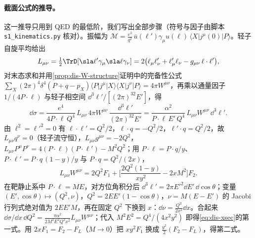 \paragraph{截面公式的推导。}这一推导只用到 QED 的最低阶，我们写出全部步骤（符号与因子由脚本 \texttt{s1\_kinematics.py} 核对）。振幅为 $\mathcal M=\frac{e^2}{q^2}\,\bar u(\ell')\gamma_\mu u(\ell)\,\langle X|j^\mu(0)|P\rangle$。轻子自旋平均给出
\[
L_{\mu\nu}=\tfrac12\TrD[\sla\ell'\gamma_\mu\sla\ell\gamma_\nu]=2\big(\ell_\mu\ell'_\nu+\ell'_\mu\ell_\nu-g_{\mu\nu}\,\ell\cdot\ell'\big),
\]
对末态求和并用\cref{prop:dis-W-structure}证明中的完备性公式 $\sum_X(2\pi)^4\delta^4(P+q-p_X)\langle P|j^\mu|X\rangle\langle X|j^\nu|P\rangle=4\pi W^{\mu\nu}$，再乘以通量因子 $1/(4P\cdot\ell)$ 与轻子相空间 $\dd^3\ell'/[(2\pi)^32E']$，得
\[
\dd\sigma=\frac{e^4}{4P\cdot\ell\,Q^4}\,L_{\mu\nu}\,4\pi W^{\mu\nu}\,\frac{\dd^3\ell'}{(2\pi)^32E'}=\frac{\alpha^2}{P\cdot\ell\,E'\,Q^4}\,L_{\mu\nu}W^{\mu\nu}\,\dd^3\ell' .
\]
由 $\ell^2=\ell'^2=0$ 有 $\ell\cdot\ell'=Q^2/2$，$\ell\cdot q=-Q^2/2$，$\ell'\cdot q=Q^2/2$，故 $L_{\mu\nu}q^\nu=0$（轻子流守恒），$L_{\mu\nu}g^{\mu\nu}=-2Q^2$，$L_{\mu\nu}P^\mu P^\nu=4(P\cdot\ell)(P\cdot\ell')-M^2Q^2$；用 $P\cdot\ell=P\cdot q/y$、$P\cdot\ell'=P\cdot q\,(1-y)/y$ 与 $P\cdot q=Q^2/(2x)$，
\[
L_{\mu\nu}W^{\mu\nu}=2Q^2F_1+\Big[\frac{2Q^2(1-y)}{xy^2}-2xM^2\Big]F_2 .
\]
在靶静止系中 $P\cdot\ell=ME$，对方位角积分后 $\dd^3\ell'=2\pi E'^2\dd E'\,\dd\cos\theta$；变量 $(E',\cos\theta)\mapsto(Q^2,\nu)$，$Q^2=2EE'(1-\cos\theta)$，$\nu=M(E-E')$ 的 Jacobi 行列式绝对值为 $2EE'M$，再在固定 $Q^2$ 下换到 $x$：$\dd\nu=\frac{Q^2}{2x^2}\dd x$。合起来 $\dd\sigma/\dd x\,\dd Q^2=\frac{\pi\alpha^2}{2M^2E^2Q^2x^2}L_{\mu\nu}W^{\mu\nu}$；代入 $M^2E^2=Q^4/(4x^2y^2)$ 即得\cref{eq:dis-xsec}的第一式。用 $2xF_1=F_2-F_L$（$M\to0$）把 $xy^2F_1$ 换成 $\frac{y^2}2(F_2-F_L)$，得第二式。


